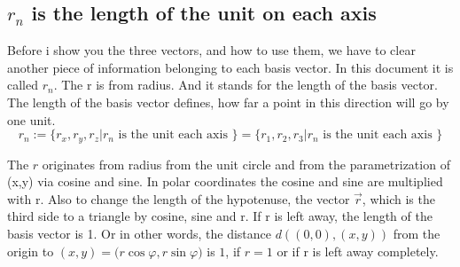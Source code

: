 \documentclass[a4paper]{article}
\begin{document}
\subsection{$r_{n}$ is the length of the unit on each axis}

Before i show you the three vectors, and how to use them, we have to clear another piece of information belonging to each
basis vector. In this document it is called $r_{n}$. The r is from radius. And it stands for the length of the basis vector.
The length of the basis vector defines, how far a point in this direction will go by one unit.\\
\begin{displaymath}
r_{n} := \{ r_{x}, r_{y}, r_{z} | r_n \mbox{ is the unit each axis }\} = \{ r_{1}, r_{2}, r_{3} | r_n \mbox { is the unit each axis } \}
\end{displaymath}

The $r$ originates from radius from the unit circle and from the parametrization of (x,y) via cosine and sine. 
In polar coordinates the cosine and sine are multiplied with r. Also to change the length of the hypotenuse, 
the vector $\vec{r}$, which is the third side to a triangle by cosine, sine and r. 
If r is left away, the length of the basis vector is 1. Or in other words, the distance $d((0,0),(x,y))$ from the origin to $(x,y)=($$r \cos \varphi$$, $$r \sin \varphi$$)$ is $1$, if $r=1$ or if r is left away completely.\\

\\
\end{document}
